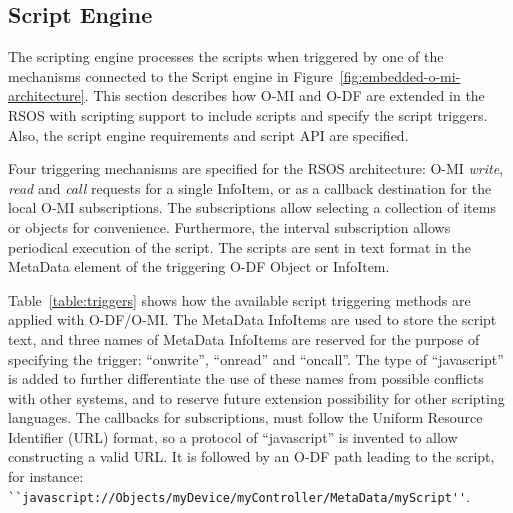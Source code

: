 
\subsection{Script Engine}

The scripting engine processes the scripts when triggered by one of the mechanisms connected to the Script engine in Figure~\ref{fig:embedded-o-mi-architecture}. This section describes how O-MI and O-DF are extended in the RSOS with scripting support to include scripts and specify the script triggers. Also, the script engine requirements and script API are specified.

Four triggering mechanisms are specified for the RSOS architecture: O-MI \emph{write}, \emph{read} and \emph{call} requests for a single InfoItem, or as a callback destination for the local O-MI subscriptions. The subscriptions allow selecting a collection of items or objects for convenience. Furthermore, the interval subscription allows periodical execution of the script. The scripts are sent in text format in the MetaData element of the triggering O-DF Object or InfoItem.

Table~\ref{table:triggers} shows how the available script triggering methods are applied with O-DF/O-MI. The MetaData InfoItems are used to store the script text, and three names of MetaData InfoItems are reserved for the purpose of specifying the trigger: ``onwrite'', ``onread'' and ``oncall''. The type of ``javascript'' is added to further differentiate the use of these names from possible conflicts with other systems, and to reserve future extension possibility for other scripting languages. The callbacks for subscriptions, must follow the Uniform Resource Identifier (URL) format, so a protocol of ``javascript'' is invented to allow constructing a valid URL. It is followed by an O-DF path leading to the script, for instance: \lstinline{``javascript://Objects/myDevice/myController/MetaData/myScript''}.

